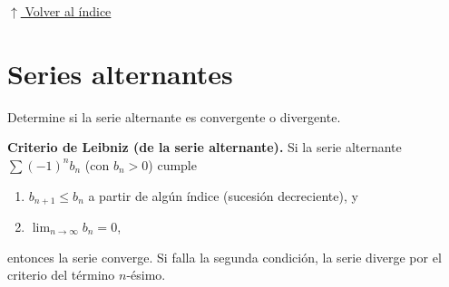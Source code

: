 \documentclass[12pt]{article}
\newcommand{\volverindice}{%
    \vspace{1em}%
    \begin{flushright}%
        \hyperlink{indice}{\small $\uparrow$ Volver al índice}%
    \end{flushright}%
}
\begin{document}
\volverindice
\newpage


\section{Series alternantes}

Determine si la serie alternante es convergente o divergente.

\vspace{0.5em}
\textbf{Criterio de Leibniz (de la serie alternante).} Si la serie alternante
$\displaystyle\sum(-1)^{n}b_n$ (con $b_n>0$) cumple

\begin{enumerate}[label=\roman*.-, leftmargin=2.5em]
    \item $b_{n+1}\le b_n$ a partir de algún índice (sucesión decreciente), y
    \item $\displaystyle\lim_{n\to\infty}b_n=0$,
\end{enumerate}

entonces la serie converge. Si falla la segunda condición, la serie diverge por
el criterio del término $n$-ésimo.
\end{document}
